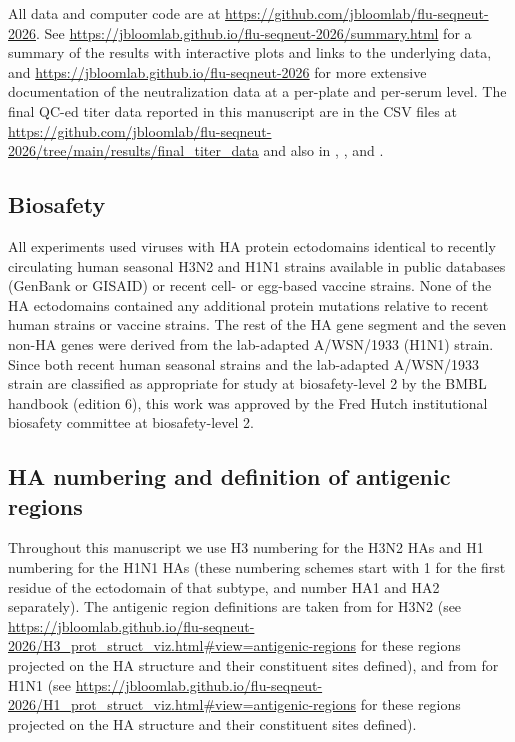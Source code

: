All data and computer code are at \href{https://github.com/jbloomlab/flu-seqneut-2026}{https://github.com/jbloomlab/flu-seqneut-2026}. See \href{https://jbloomlab.github.io/flu-seqneut-2026/summary.html}{https://jbloomlab.github.io/flu-seqneut-2026/summary.html} for a summary of the results with interactive plots and links to the underlying data, and \href{https://jbloomlab.github.io/flu-seqneut-2026}{https://jbloomlab.github.io/flu-seqneut-2026} for more extensive documentation of the neutralization data at a per-plate and per-serum level. The final QC-ed titer data reported in this manuscript are in the CSV files at \href{https://github.com/jbloomlab/flu-seqneut-2026/tree/main/results/final_titer_data}{https://github.com/jbloomlab/flu-seqneut-2026/tree/main/results/final\_titer\_data} and also in \textbf{}, \textbf{}, and \textbf{}.

\subsection{Biosafety}

All experiments used viruses with HA protein ectodomains identical to recently circulating human seasonal H3N2 and H1N1 strains available in public databases (GenBank or GISAID) or recent cell- or egg-based vaccine strains. None of the HA ectodomains contained any additional protein mutations relative to recent human strains or vaccine strains. The rest of the HA gene segment and the seven non-HA genes were derived from the lab-adapted A/WSN/1933 (H1N1) strain. Since both recent human seasonal strains and the lab-adapted A/WSN/1933 strain are classified as appropriate for study at biosafety-level 2 by the BMBL handbook (edition 6), this work was approved by the Fred Hutch institutional biosafety committee at biosafety-level 2.

\subsection{HA numbering and definition of antigenic regions}

Throughout this manuscript we use H3 numbering for the H3N2 HAs and H1 numbering for the H1N1 HAs (these numbering schemes start with 1 for the first residue of the ectodomain of that subtype, and number HA1 and HA2 separately). The antigenic region definitions are taken from \citep{stray2012} for H3N2 (see \href{https://jbloomlab.github.io/flu-seqneut-2026/H3_prot_struct_viz.html\#view=antigenic-regions}{https://jbloomlab.github.io/flu-seqneut-2026/H3\_prot\_struct\_viz.html\#view=antigenic-regions} for these regions projected on the HA structure and their constituent sites defined), and from \citep{wilson2015} for H1N1 (see \href{https://jbloomlab.github.io/flu-seqneut-2026/H1_prot_struct_viz.html\#view=antigenic-regions}{https://jbloomlab.github.io/flu-seqneut-2026/H1\_prot\_struct\_viz.html\#view=antigenic-regions} for these regions projected on the HA structure and their constituent sites defined).

